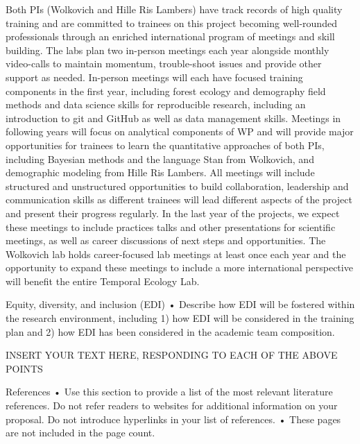 \documentclass[11pt]{article}
\begin{document}
Both PIs (Wolkovich and Hille Ris Lambers) have track records of high quality training and are committed to trainees on this project becoming well-rounded professionals through an enriched international program of meetings and skill building. The labs plan two in-person meetings each year  alongside monthly video-calls to maintain momentum, trouble-shoot issues and provide other support as needed. In-person meetings will each have focused training components in the first year, including forest ecology and demography field methods and data science skills for reproducible research, including an introduction to git and GitHub as well as data management skills. Meetings in following years will focus on analytical components of WP and will provide major opportunities for trainees to learn the quantitative approaches of both PIs, including Bayesian methods and the language Stan from Wolkovich, and demographic modeling from Hille Ris Lambers. All meetings will include structured and unstructured opportunities to build collaboration, leadership and communication skills as different trainees will lead different aspects of the project and present their progress regularly. In the last year of the projects, we expect these meetings to include practices talks and other presentations for scientific meetings, as well as career discussions of next steps and opportunities. The Wolkovich lab holds career-focused lab meetings at least once each year and the opportunity to expand these meetings to include a more international perspective will benefit the entire Temporal Ecology Lab. 


Equity, diversity, and inclusion (EDI) %
•	Describe how EDI will be fostered within the research environment, including 1) how EDI will be considered in the training plan and 2) how EDI has been considered in the academic team composition.

INSERT YOUR TEXT HERE, RESPONDING TO EACH OF THE ABOVE POINTS

References %
•	Use this section to provide a list of the most relevant literature references. Do not refer readers to websites for additional information on your proposal. Do not introduce hyperlinks in your list of references.
•	These pages are not included in the page count.

\end{document}
